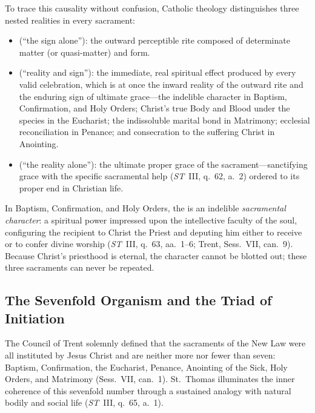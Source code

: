 To trace this causality without confusion, Catholic theology distinguishes three nested realities in every sacrament:
\begin{itemize}
  \item \textbf{} (``the sign alone''): the outward perceptible rite composed of determinate matter (or quasi-matter) and form.
  \item \textbf{} (``reality and sign''): the immediate, real spiritual effect produced by every valid celebration, which is at once the inward reality of the outward rite and the enduring sign of ultimate grace---the indelible character in Baptism, Confirmation, and Holy Orders; Christ's true Body and Blood under the species in the Eucharist; the indissoluble marital bond in Matrimony; ecclesial reconciliation in Penance; and consecration to the suffering Christ in Anointing.
  \item \textbf{} (``the reality alone''): the ultimate proper grace of the sacrament---sanctifying grace with the specific sacramental help (\emph{ST}~III, q.~62, a.~2) ordered to its proper end in Christian life.
\end{itemize}
In Baptism, Confirmation, and Holy Orders, the  is an indelible \emph{sacramental character}: a spiritual power impressed upon the intellective faculty of the soul, configuring the recipient to Christ the Priest and deputing him either to receive or to confer divine worship (\emph{ST}~III, q.~63, aa.~1--6; Trent, Sess.~VII, can.~9). Because Christ's priesthood is eternal, the character cannot be blotted out; these three sacraments can never be repeated.

\subsection{The Sevenfold Organism and the Triad of Initiation}
\label{subsec:sevenfold-organism}

The Council of Trent solemnly defined that the sacraments of the New Law were all instituted by Jesus Christ and are neither more nor fewer than seven: Baptism, Confirmation, the Eucharist, Penance, Anointing of the Sick, Holy Orders, and Matrimony (Sess.~VII, can.~1). St.~Thomas illuminates the inner coherence of this sevenfold number through a sustained analogy with natural bodily and social life (\emph{ST}~III, q.~65, a.~1).

